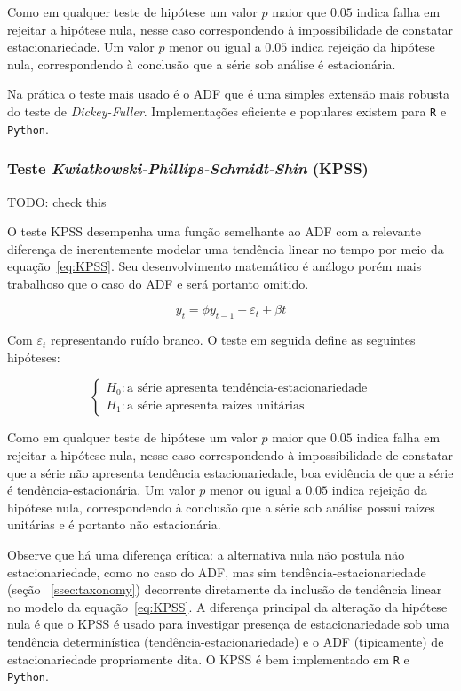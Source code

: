 Como em qualquer teste de hipótese um valor $p$ maior que $0.05$ indica falha
em rejeitar a hipótese nula, nesse caso correspondendo à impossibilidade de
constatar estacionariedade. Um valor $p$ menor ou igual a $0.05$ indica
rejeição da hipótese nula, correspondendo à conclusão que a série sob análise
é estacionária.

Na prática o teste mais usado é o ADF que é uma simples extensão mais robusta
do teste de \emph{Dickey-Fuller}. Implementações eficiente e populares existem
para \verb+R+ e \verb+Python+.

\subsubsection{Teste \emph{Kwiatkowski-Phillips-Schmidt-Shin} (KPSS)}

TODO: check this

O teste KPSS desempenha uma função semelhante ao ADF com a relevante
diferença de inerentemente modelar uma tendência linear no tempo por meio da
equação~\ref{eq:KPSS}. Seu desenvolvimento matemático é análogo porém mais
trabalhoso que o caso do ADF e será portanto omitido.

\begin{equation}\label{eq:KPSS}
    y_t = \phi y_{t-1} + \varepsilon_t + \beta t
\end{equation}

Com $\varepsilon_t$ representando ruído branco. O teste em seguida define as
seguintes hipóteses:

$$
\begin{cases}
    H_0: \text{a série apresenta tendência-estacionariedade} \\
    H_1: \text{a série apresenta raízes unitárias}
\end{cases}
$$

Como em qualquer teste de hipótese um valor $p$ maior que $0.05$ indica falha
em rejeitar a hipótese nula, nesse caso correspondendo à impossibilidade de
constatar que a série não apresenta tendência estacionariedade, boa evidência
de que a série é tendência-estacionária. Um valor $p$ menor ou igual a $0.05$
indica rejeição da hipótese nula, correspondendo à conclusão que a série sob
análise possui raízes unitárias e é portanto não estacionária.

Observe que há uma diferença crítica: a alternativa nula não postula não
estacionariedade, como no caso do ADF, mas sim tendência-estacionariedade
(seção ~\ref{ssec:taxonomy}) decorrente diretamente da inclusão de tendência
linear no modelo da equação~\ref{eq:KPSS}. A diferença principal da alteração
da hipótese nula é que o KPSS é usado para investigar presença de
estacionariedade sob uma tendência determinística (tendência-estacionariedade)
e o ADF (tipicamente) de estacionariedade propriamente dita. O KPSS é bem
implementado em \verb+R+ e \verb+Python+.


